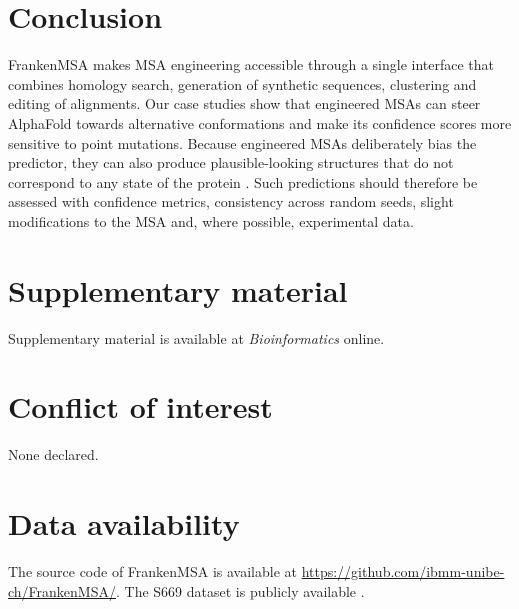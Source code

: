 \documentclass[webpdf,contemporary,large]{oup-authoring-template}%
\begin{document}
\section{Conclusion}

FrankenMSA makes MSA engineering accessible through a single interface that combines homology search, generation of synthetic sequences, clustering and editing of alignments.
Our case studies show that engineered MSAs can steer AlphaFold towards alternative conformations and make its confidence scores more sensitive to point mutations.
Because engineered MSAs deliberately bias the predictor, they can also produce plausible-looking structures that do not correspond to any state of the protein \cite{inverse_folding}.
Such predictions should therefore be assessed with confidence metrics, consistency across random seeds, slight modifications to the MSA and, where possible, experimental data.

\section*{Supplementary material}
Supplementary material is available at \textit{Bioinformatics} online.

\section*{Conflict of interest}
None declared.

\section*{Data availability}
The source code of FrankenMSA is available at \url{https://github.com/ibmm-unibe-ch/FrankenMSA/}. The S669 dataset is publicly available \cite{stability_dataset,stability_dataset_fixed}.



\end{document}
